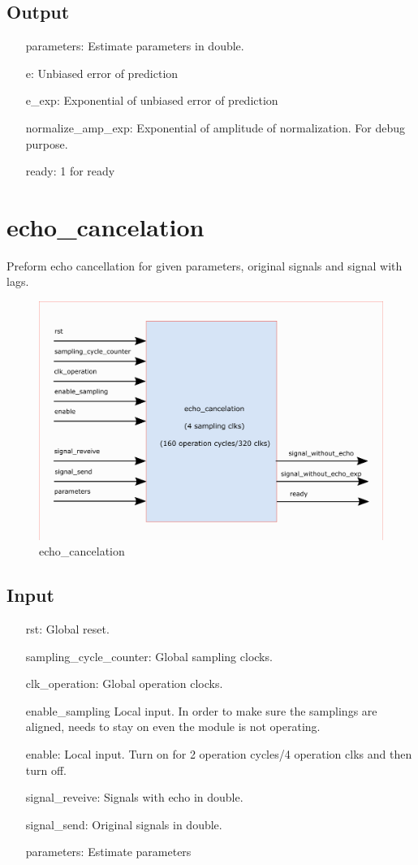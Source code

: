\documentclass[twoside,a4paper]{refart}
\begin{document}
\subsection{Output}
\begin{itemize}
	\item[parameters:] Estimate parameters in double.
	\item[e:] Unbiased error of prediction
	\item[e\_exp:] Exponential of unbiased error of prediction
	\item[normalize\_amp\_exp:] Exponential of amplitude of normalization. For debug purpose.
	\item[ready:] 1 for ready
\end{itemize}

\section{echo\_cancelation}
Preform echo cancellation for given parameters, original signals and signal with lags. 
\begin{figure}[H]
	\centering
	\includegraphics[scale=1.2]{echo_cancelation.png}
	\caption{echo\_cancelation}
	\label{}
\end{figure}
\subsection{Input}
\begin{itemize}
	\item[rst:      ] Global reset.
	\item[sampling\_cycle\_counter:] Global sampling clocks.
	\item[clk\_operation:] Global operation clocks.
	\item[enable\_sampling] Local input. In order to make sure the samplings are aligned, needs to stay on even the module is not operating.
	\item[enable:] Local input. Turn on for 2 operation cycles/4 operation clks and then turn off.
	\item[signal\_reveive:] Signals with echo in double.
	\item[signal\_send:] Original signals in double.
	\item[parameters:] Estimate parameters
\end{itemize}
\end{document}

